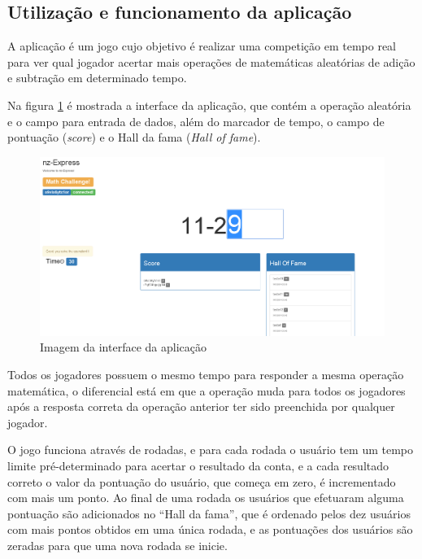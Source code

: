 \subsection{Utilização e funcionamento da aplicação}
\label{subsec: Utilização e funcionamento da aplicação}
 A aplicação é um jogo cujo objetivo é realizar uma competição em tempo real para ver qual jogador acertar mais operações de matemáticas aleatórias de adição e subtração em determinado tempo.

Na figura \ref{fig:Imagem da interface da aplicação} é mostrada a interface da aplicação, que contém a operação aleatória e o campo para entrada de dados, além do marcador de tempo, o campo de pontuação (\textit{score}) e o Hall da fama (\textit{Hall of fame}).

    \begin{figure}[htb]
    \centering
    \includegraphics[scale=0.3]{images/index_mean_math_race.png}
    \caption{Imagem da interface da aplicação}
    \label{fig:Imagem da interface da aplicação}
    \end{figure}
    
Todos os jogadores possuem o mesmo tempo para responder a mesma operação matemática, o diferencial está em que a operação muda para todos os jogadores após a resposta correta da operação anterior ter sido preenchida por qualquer jogador.

O jogo funciona através de rodadas, e para cada rodada o usuário tem um tempo limite pré-determinado para acertar o resultado da conta, e a cada resultado correto o valor da pontuação do usuário, que começa em zero, é incrementado com mais um ponto. Ao final de uma rodada os usuários que efetuaram alguma pontuação são adicionados no ``Hall da fama'', que é ordenado pelos dez usuários com mais pontos obtidos em uma única rodada, e as pontuações dos usuários são zeradas para que uma nova rodada se inicie. 

